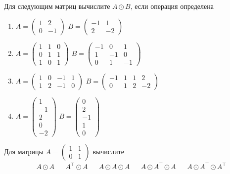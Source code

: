 \begin{exercise}
Для следующим матриц вычислите \(A\odot B\), если операция определена
\begin{enumerate}
	\item \(A=\begin{pmatrix} 1 & 2 \\ 0 & -1 \end{pmatrix}\) 
	\(B=\begin{pmatrix} -1 & 1 \\ 2 & -2 \end{pmatrix}\)
	\item \(A=\begin{pmatrix} 1 & 1 & 0 \\ 0 & 1 & 1 \\ 1 & 0 & 1 \end{pmatrix}\) 
	\(B=\begin{pmatrix} -1 & 0 & 1 \\ 1 & -1 & 0 \\ 0 & 1 & -1 \end{pmatrix}\)
	\item \(A=\begin{pmatrix} 1 & 0 & -1 & 1\\ 1 & 2 & -1 & 0  \end{pmatrix}\) 
	\(B=\begin{pmatrix} -1 & 1 & 1 & 2 \\ 0 & 1 & 2 & -2 \end{pmatrix}\)
	\item \(A=\begin{pmatrix} 1 \\ -1 \\ 2 \\ 0 \\ -2  \end{pmatrix}\) 
	\(B=\begin{pmatrix} 0 \\ 2 \\ -1 \\ 1 \\ 0  \end{pmatrix}\)
\end{enumerate}
\end{exercise}

\begin{exercise}
Для матрицы \(A=\begin{pmatrix} 1 & 1 \\ 0 & 1 \end{pmatrix}\) вычислите
\begin{align*}
	&A\odot A & &A^\top\odot A & &A\odot A\odot A & &A\odot A^\top\odot A & &A\odot A^\top\odot A^\top
\end{align*}
\end{exercise}

